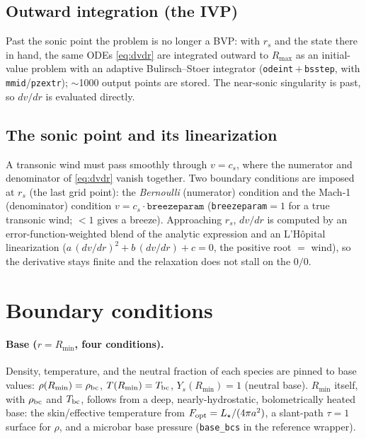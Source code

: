 \documentclass[english,a4paper]{my_memo}
\newcommand{\code}[1]{\texttt{#1}}
\begin{document}
\subsection{Outward integration (the IVP)}
Past the sonic point the problem is no longer a BVP: with $r_s$ and the
state there in hand, the same ODEs \eqref{eq:dvdr} are integrated outward
to $R_{\max}$ as an initial-value problem with an adaptive
Bulirsch--Stoer integrator (\code{odeint}\,$+$\,\code{bsstep}, with
\code{mmid}/\code{pzextr}); $\sim$1000 output points are stored. The
near-sonic singularity is past, so $dv/dr$ is evaluated directly.

\subsection{The sonic point and its linearization}\label{sec:sonic}
A transonic wind must pass smoothly through $v=c_s$, where the numerator
and denominator of \eqref{eq:dvdr} vanish together. Two boundary
conditions are imposed at $r_s$ (the last grid point): the
\emph{Bernoulli} (numerator) condition and the Mach-1 (denominator)
condition $v=c_s\cdot\code{breezeparam}$ (\code{breezeparam}$=1$ for a
true transonic wind; $<1$ gives a breeze). Approaching $r_s$, $dv/dr$ is
computed by an error-function-weighted blend of the analytic expression
and an L'H\^opital linearization
($a\,(dv/dr)^2+b\,(dv/dr)+c=0$, the positive root $=$ wind), so the
derivative stays finite and the relaxation does not stall on the $0/0$.

\section{Boundary conditions}
\paragraph{Base ($r=R_{\min}$, four conditions).} Density, temperature,
and the neutral fraction of each species are pinned to base values:
$\rho(R_{\min})=\rho_{\rm bc}$, $T(R_{\min})=T_{\rm bc}$,
$Y_s(R_{\min})=1$ (neutral base). $R_{\min}$ itself, with $\rho_{\rm bc}$
and $T_{\rm bc}$, follows from a deep, nearly-hydrostatic, bolometrically
heated base: the skin/effective temperature from $F_{\rm opt}=L_\star/(4\pi
a^2)$, a slant-path $\tau=1$ surface for $\rho$, and a microbar base
pressure (\code{base\_bcs} in the reference wrapper).
\end{document}
